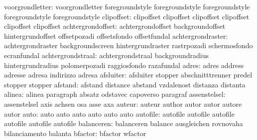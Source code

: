           voorgrondletter: voorgrondletter           foregroundstyle
                           foregroundstyle           foregroundstyle
                           foregroundstyle           foregroundstyle
clipoffset: clipoffset   clipoffset
            clipoffset   clipoffset
            clipoffset   clipoffset            
        achtergrondoffset: achtergrondoffset         backgroundoffset
                           hintergrundoffset         offsetpozadi
                           offsetsfondo              offsetfundal
        achtergrondraster: achtergrondraster         backgroundscreen
                           hintergrundraster         rastrpozadi
                           schermosfondo             ecranfundal
        achtergrondstraal: achtergrondstraal         backgroundradius
                           hintergrundradius         polomerpozadi
                           raggiosfondo              razafundal
                    adres: adres                     address
                           adresse                   adresa
                           indirizzo                 adresa
                afsluiter: afsluiter                 stopper
                           abschnitttrenner          predel
                           stopper                   stopper
                  afstand: afstand                   distance
                           abstand                   vzdalenost
                           distanza                  distanta
                   alinea: alinea                    paragraph
                           absatz                    odstavec
                           capoverso                 paragraf
             assenstelsel: assenstelsel              axis
                           achsen                    osa
                           asse                      axa
                   auteur: auteur                    author
                           autor                     autor
                           autore                    autor
                     auto: auto                      auto
                           auto                      auto
                           auto                      auto
                 autofile: autofile                  autofile
                           autofile                  autofile
                           autofile                  autofile %
               balanceren: balanceren                balance
                           ausgleichen               rovnovaha
                           bilanciamento             balanta
                  bfactor: bfactor                   wfactor
